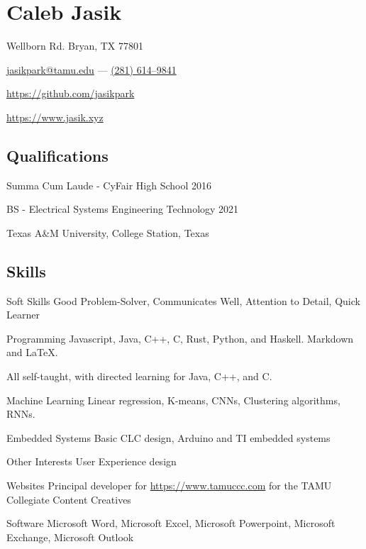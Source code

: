 \documentclass[letterpaper,10pt]{article}
\begin{document}
    \section{\Huge Caleb Jasik}\label{sec:hugecaleb-jasik}

    \hfill Wellborn Rd. Bryan, TX 77801

    \hfill \href{mailto:jasikpark@tamu.edu}{jasikpark@tamu.edu} ---
    \href{tel:2816149841}{(281) 614--9841}

    \hfill \href{https://github.com/jasikpark}{https://github.com/jasikpark}

    \hfill \href{https://jasik.xyz}{https://www.jasik.xyz}

    \subsection{Qualifications}\label{subsec:qualifications}

    Summa Cum Laude - CyFair High School 2016

    BS - Electrical Systems Engineering Technology 2021

    Texas A\&M University, College Station, Texas


    \subsection{Skills}\label{subsec:skills}

    \begin{skills}
        \item[Soft Skills]
        Good Problem-Solver, Communicates Well, Attention to Detail, Quick Learner
        \item[Programming]
        Javascript, Java, C++, C, Rust, Python, and Haskell. Markdown and LaTeX.

        All self-taught, with directed learning for Java, C++, and C\@.
        \item[Machine Learning]
        Linear regression, K-means, CNNs, Clustering algorithms, RNNs.
        \item[Embedded Systems]
        Basic CLC design, Arduino and TI embedded systems
        \item[Other Interests]
        User Experience design
        \item[Websites]
        Principal developer for \href{https://www.tamuccc.com}{https://www.tamuccc.com} for the TAMU Collegiate Content Creatives
        \item[Software]
        Microsoft Word, Microsoft Excel, Microsoft Powerpoint, Microsoft Exchange, Microsoft Outlook
    \end{skills}
\end{document}
